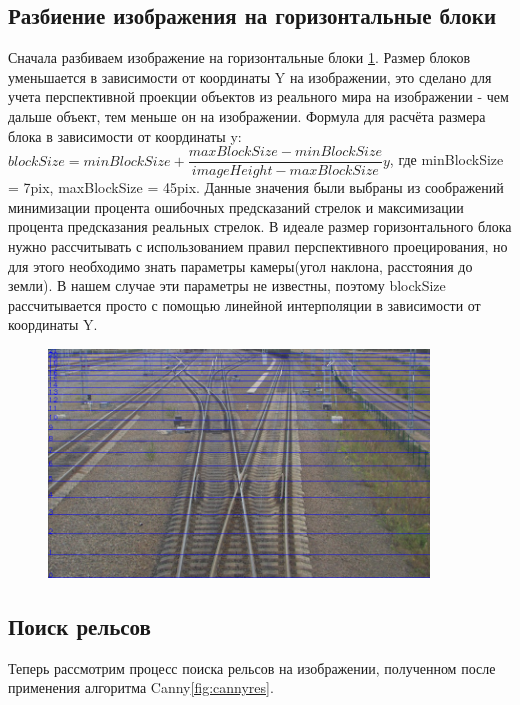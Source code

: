 \subsection{Разбиение изображения на горизонтальные блоки}
Сначала разбиваем изображение на горизонтальные блоки \ref{fig:horizontal_blocks}. Размер блоков уменьшается в зависимости от координаты Y на изображении, это сделано для учета перспективной проекции объектов из реального мира на изображении - чем дальше объект, тем меньше он на изображении.
\newline
Формула для расчёта размера блока в зависимости от координаты y:
\newline
$blockSize = minBlockSize + \dfrac{maxBlockSize - minBlockSize}{imageHeight - maxBlockSize}y$, где  minBlockSize = 7pix, maxBlockSize = 45pix. Данные значения были выбраны из соображений минимизации процента ошибочных предсказаний стрелок и максимизации процента предсказания реальных стрелок.
В идеале размер горизонтального блока нужно рассчитывать с использованием правил перспективного проецирования\cite{b:projection}, но для этого необходимо знать параметры камеры(угол наклона, расстояния до земли).
В нашем случае эти параметры не известны, поэтому blockSize рассчитывается просто с помощью линейной интерполяции в зависимости от координаты Y.

\begin{figure}[!h]
	\centering
	\includegraphics[width=0.9\textwidth]{pictures/horizontal_blocks.png}
	\caption[Разбиение на горизонтальные блоки]{}
	\label{fig:horizontal_blocks}
\end{figure}
\newpage
\subsection{Поиск рельсов}\label{rails_find}
Теперь рассмотрим процесс поиска рельсов на изображении, полученном после применения алгоритма Canny\ref{fig:cannyres}.

